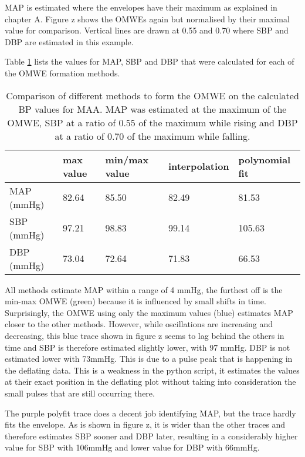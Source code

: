 MAP is estimated where the envelopes have their maximum as explained in chapter A. Figure z shows the OMWEs again but normalised by their maximal value for comparison. Vertical lines are drawn at 0.55 and 0.70 where SBP and DBP are estimated in this example.

Table \ref{tbl:maacomp} lists the values for MAP, SBP and DBP that were calculated for each of the OMWE formation methods. 

\begin{table}\label{tbl:maacomp}
\centering
\begin{tabular}{lllll}
\hline
           & max value & min/max value & interpolation & polynomial fit \\ \hline
MAP (mmHg) & 82.64     & 85.50         & 82.49         & 81.53          \\ 
SBP (mmHg) & 97.21     & 98.83         & 99.14         & 105.63         \\ 
DBP (mmHg) & 73.04     & 72.64         & 71.83         & 66.53          \\ \hline
\end{tabular}
\caption[Comparison of different methods to form the OMWE on the calculated BP values for the MAA.]{Comparison of different methods to form the OMWE on the calculated BP values for MAA. MAP was estimated at the maximum of the OMWE, SBP at a ratio of 0.55 of the maximum while rising and DBP at a ratio of 0.70 of the maximum while falling.}
\end{table}

All methods estimate MAP within a range of 4 mmHg, the furthest off is the min-max OMWE (green) because it is influenced by small shifts in time. Surprisingly, the OMWE using only the maximum values (blue) estimates MAP closer to the other methods. However, while oscillations are increasing and decreasing, this blue trace shown in figure z seems to lag behind the others in time and SBP is therefore estimated slightly lower, with 97 mmHg. DBP is not estimated lower with 73mmHg. This is due to a pulse peak that is happening in the deflating data. This is a weakness in the python script, it estimates the values at their exact position in the deflating plot without taking into consideration the small pulses that are still occurring there.

The purple polyfit trace does a decent job identifying MAP, but the trace hardly fits the envelope. As is shown in figure z, it is wider than the other traces and therefore estimates SBP sooner and DBP later, resulting in a considerably higher value for SBP with 106mmHg and lower value for DBP with 66mmHg. 

